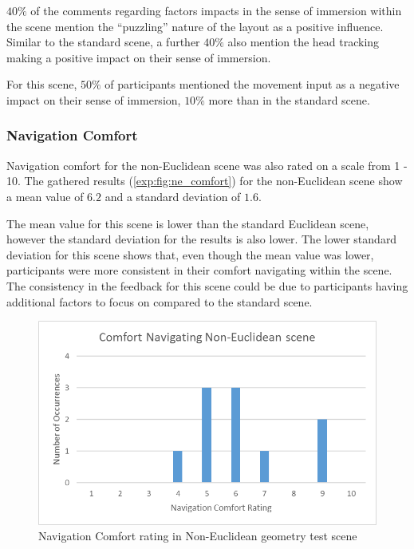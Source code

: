 				$40\%$ of the comments regarding factors impacts in the sense of immersion within the scene mention the \enquote{puzzling} nature of the layout as a positive influence.
				Similar to the standard scene, a further $40\%$ also mention the head tracking making a positive impact on their sense of immersion.

				For this scene, $50\%$ of participants mentioned the movement input as a negative impact on their sense of immersion, $10\%$ more than in the standard scene.

			\subsubsection{Navigation Comfort}

				Navigation comfort for the non-Euclidean scene was also rated on a scale from 1 - 10.
				The gathered results (\autoref{exp:fig:ne_comfort}) for the non-Euclidean scene show a mean value of $6.2$ and a standard deviation of $1.6$.

				The mean value for this scene is lower than the standard Euclidean scene, however the standard deviation for the results is also lower.
				The lower standard deviation for this scene shows that, even though the mean value was lower, participants were more consistent in their comfort navigating within the scene.
				The consistency in the feedback for this scene could be due to participants having additional factors to focus on compared to the standard scene.

				\begin{figure}[h]
					\includegraphics[width=1\textwidth]{Images/NE_Comfort}
					\centering
					\caption{Navigation Comfort rating in Non-Euclidean geometry test scene}
					\label{exp:fig:ne_comfort}
				\end{figure}

